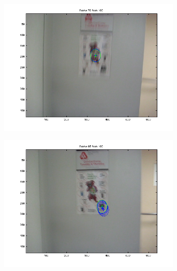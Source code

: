 \documentclass[hyperref={pdfpagelabels=false}]{beamer}
\begin{document}
\begin{frame}
\begin{figure}
\begin{subfigure}[b]{0.3\textwidth}
                 \includegraphics[width=\textwidth]{results/owl/Frame0070.png}
         \end{subfigure}
         \begin{subfigure}[b]{0.3\textwidth}
                 \includegraphics[width=\textwidth]{results/owl/Frame0085.png}
         \end{subfigure}
\end{figure}         

\end{frame}
\end{document}
